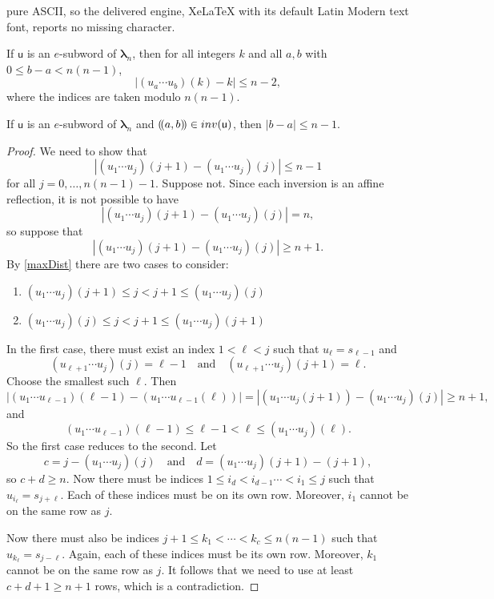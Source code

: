 \documentclass[10pt,a4paper]{amsart}
\newcommand{\Inv}{\textsc{inv}}
\newcommand{\blambda}{\bm{\lambda}}
\renewcommand{\u}{\mathsf{u}}
\begin{document}
pure ASCII, so the delivered engine, XeLaTeX with its default Latin Modern text font, reports no missing character.
\begin{lemma}
\label{maxDist}
    If $\u$ is an $e$-subword of $\blambda_n$, then for all integers $k$ and all $a, b$ with $0 \leq b - a < n(n-1)$,
    \[
        \big|\left(u_{a}\cdots u_{b}\right)(k) - k\big| \leq n-2,
    \]
    where the indices are taken modulo $n(n-1)$.
\end{lemma}

\begin{lemma}
\label{smallMoves}
    If $\u$ is an $e$-subword of $\blambda_n$ and $(\!(a,b)\!) \in \Inv(\u)$, then $|b - a| \leq n-1$.
\end{lemma}

\begin{proof}
    We need to show that
    \[
        \left|\left(u_1\cdots u_{j}\right)(j+1) - \left(u_1\cdots u_{j}\right)(j)\right| \leq n-1
    \]
    for all $j = 0,\dots,n(n-1)-1$. Suppose not. Since each inversion is an affine reflection, it is not possible to have
    \[
        |\left(u_1\cdots u_{j}\right)(j+1) - \left(u_1\cdots u_{j}\right)(j)| = n,
    \]
    so suppose that
    \[
        \left|\left(u_1\cdots u_{j}\right)(j+1) - \left(u_1\cdots u_{j}\right)(j)\right| \geq n+1.
    \]
    By \cref{maxDist} there are two cases to consider:
    \begin{enumerate}
        \item $\left(u_1\cdots u_{j}\right)(j+1) \leq j < j + 1 \leq \left(u_1\cdots u_{j}\right)(j)$
        \item $\left(u_1\cdots u_{j}\right)(j) \leq j < j + 1 \leq \left(u_1\cdots u_{j}\right)(j+1)$
    \end{enumerate}
    In the first case, there must exist an index $1 < \ell < j$ such that $u_\ell = s_{\ell - 1}$ and
    \[
        \left(u_{\ell + 1} \cdots u_j\right)(j) = \ell-1 \quad \text{and} \quad \left(u_{\ell + 1} \cdots u_j\right)(j+1) = \ell.
    \]
    Choose the smallest such $\ell$. Then
    \[
        \left|\left(u_{1}\cdots u_{\ell-1}\right)(\ell-1) - \left(u_{1}\cdots u_{\ell-1}(\ell)\right)\right| = \left|\left(u_1\cdots u_{j}(j+1)\right) - \left(u_1\cdots u_{j}\right)(j)\right| \geq n+1,
    \]
    and
    \[
        \left(u_1\cdots u_{\ell-1}\right)(\ell - 1) \leq \ell-1 < \ell \leq \left(u_1\cdots u_{j}\right)(\ell).
    \]
    So the first case reduces to the second.  Let
    \[
        c = j -  \left(u_1\cdots u_{j}\right)(j) \quad \text{and} \quad d = \left(u_1\cdots u_{j}\right)(j+1) - (j+1),
    \]
    so $c + d \geq n$. Now there must be indices $1 \leq i_d < i_{d-1} \cdots < i_1 \leq j$ such that $u_{i_\ell} = s_{j + \ell}$. Each of these indices must be on its own row. Moreover, $i_1$ cannot be on the same row as $j$.

    Now there must also be indices $j+1 \leq k_1 < \cdots < k_c \leq n(n-1)$ such that $u_{k_\ell} = s_{j - \ell}$. Again, each of these indices must be its own row. Moreover, $k_1$ cannot be on the same row as $j$.  It follows that we need to use at least $c + d + 1 \geq n + 1$ rows, which is a contradiction.
\end{proof}
\end{document}
